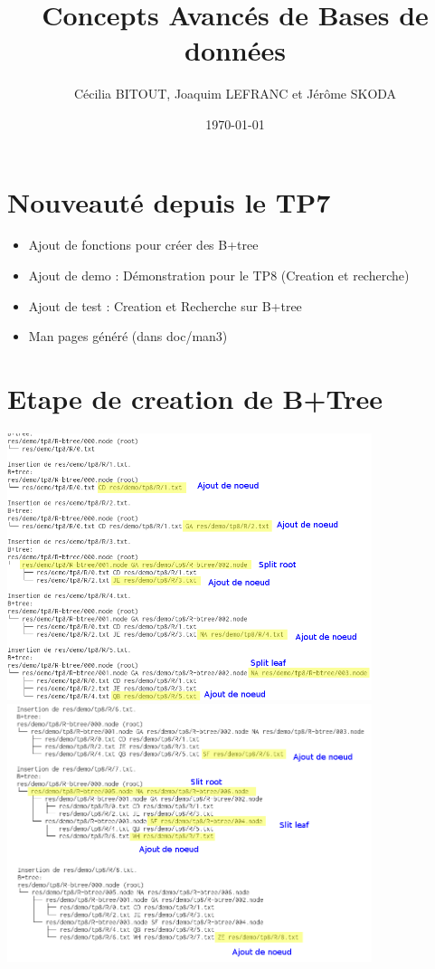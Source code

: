 \documentclass[a4paper]{article}
\title{Concepts Avancés de Bases de données}
\author{Cécilia BITOUT, Joaquim LEFRANC et Jérôme SKODA}
\date{\today}
\begin{document}
\maketitle

\section{Nouveauté depuis le TP7}

\begin{itemize}
  \item Ajout de fonctions pour créer des B+tree
  \item Ajout de demo : Démonstration pour le TP8 (Creation et recherche)
  \item Ajout de test : Creation et Recherche sur B+tree
  \item Man pages généré (dans doc/man3)
\end{itemize}

\section{Etape de creation de B+Tree}

\includegraphics[width=0.8\textwidth]{btree-1.png}
\newline
\includegraphics[width=0.8\textwidth]{btree-2.png}
\newline
\end{document}
